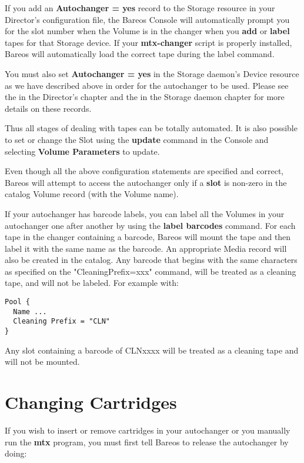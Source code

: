 If you add an {\bf Autochanger = yes} record to the Storage resource in your
Director's configuration file, the Bareos Console will automatically prompt
you for the slot number when the Volume is in the changer when
you {\bf add} or {\bf label} tapes for that Storage device. If your
{\bf mtx-changer} script is properly installed, Bareos will automatically
load the correct tape during the label command.

You must also set
{\bf Autochanger = yes} in the Storage daemon's Device resource
as we have described above in order for the autochanger to be used.
Please see the
 in the Director's chapter
and the
 in the Storage daemon
chapter for more details on these records.


Thus all stages of dealing with tapes can be totally automated. It is also
possible to set or change the Slot using the {\bf update} command in the
Console and selecting {\bf Volume Parameters} to update.

Even though all the above configuration statements are specified and correct,
Bareos will attempt to access the autochanger only if a {\bf slot} is non-zero
in the catalog Volume record (with the Volume name).

If your autochanger has barcode labels, you can label all the Volumes in
your autochanger one after another by using the {\bf label barcodes} command.
For each tape in the changer containing a barcode, Bareos will mount the tape
and then label it with the same name as the barcode. An appropriate Media
record will also be created in the catalog. Any barcode that begins with the
same characters as specified on the "CleaningPrefix=xxx" command, will be
treated as a cleaning tape, and will not be labeled.
For example with:
\footnotesize
\begin{verbatim}
Pool {
  Name ...
  Cleaning Prefix = "CLN"
}
\end{verbatim}
\normalsize

Any slot containing a barcode of CLNxxxx will be treated as a cleaning tape
and will not be mounted.


\section{Changing Cartridges}
If you wish to insert or remove cartridges in your autochanger or
you manually run the {\bf mtx} program, you must first tell Bareos
to release the autochanger by doing:

